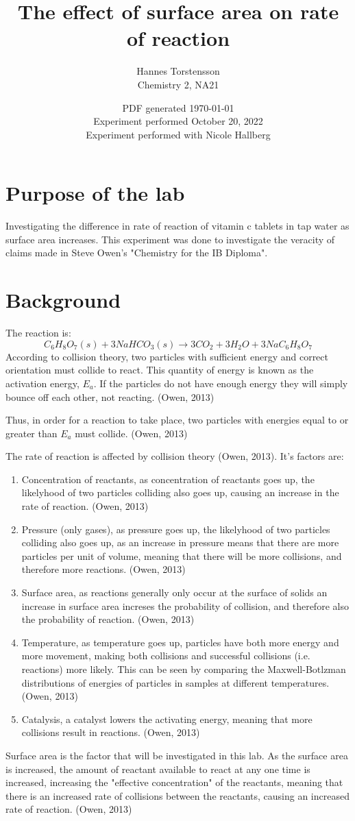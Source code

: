 \documentclass[twoside]{article}
\title{The effect of surface area on rate of reaction}
\author{Hannes Torstensson \\ Chemistry 2, NA21}
\date{PDF generated \today \\ Experiment performed October 20, 2022 \\ Experiment performed with Nicole Hallberg}
\begin{document}
	\maketitle
	\section*{Purpose of the lab}
		Investigating the difference in rate of reaction of vitamin c tablets in tap water as surface area increases. This experiment was done to investigate the veracity of claims made in Steve Owen's "Chemistry for the IB Diploma".
	\section*{Background}
		The reaction is:
		\[C_6H_8O_7 (s) + 3NaHCO_3 (s) \to 3CO_2 + 3H_2O + 3NaC_6H_8O_7\]
		According to collision theory, two particles with sufficient energy and correct orientation must collide to react. This quantity of energy is known as the activation energy, $E_a$. If the particles do not have enough energy they will simply bounce off each other, not reacting. (Owen, 2013)

		Thus, in order for a reaction to take place, two particles with energies equal to or greater than $E_a$ must collide. (Owen, 2013)

		The rate of reaction is affected by collision theory (Owen, 2013). It's factors are:
		\begin{enumerate}
			\item{Concentration of reactants, as concentration of reactants goes up, the likelyhood of two particles colliding also goes up, causing an increase in the rate of reaction. (Owen, 2013)}
			\item{Pressure (only gases), as pressure goes up, the likelyhood of two particles colliding also goes up, as an increase in pressure means that there are more particles per unit of volume, meaning that there will be more collisions, and therefore more reactions. (Owen, 2013)}
			\item{Surface area, as reactions generally only occur at the surface of solids an increase in surface area increses the probability of collision, and therefore also the probability of reaction. (Owen, 2013)}
			\item{Temperature, as temperature goes up, particles have both more energy and more movement, making both collisions and successful collisions (i.e. reactions) more likely. This can be seen by comparing the Maxwell-Botlzman distributions of energies of particles in samples at different temperatures. (Owen, 2013)}
			\item{Catalysis, a catalyst lowers the activating energy, meaning that more collisions result in reactions. (Owen, 2013)}
		\end{enumerate}
		Surface area is the factor that will be investigated in this lab. As the surface area is increased, the amount of reactant available to react at any one time is increased, increasing the "effective concentration" of the reactants, meaning that there is an increased rate of collisions between the reactants, causing an increased rate of reaction. (Owen, 2013)
\end{document}
